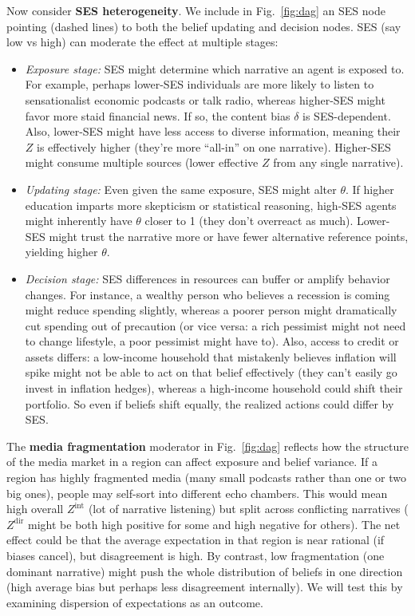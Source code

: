 \documentclass[12pt]{article}
\begin{document}
Now consider \textbf{SES heterogeneity}. We include in Fig.~\ref{fig:dag} an SES node pointing (dashed lines) to both the belief updating and decision nodes. SES (say low vs high) can moderate the effect at multiple stages:
\begin{itemize}
    \item \emph{Exposure stage:} SES might determine which narrative an agent is exposed to. For example, perhaps lower-SES individuals are more likely to listen to sensationalist economic podcasts or talk radio, whereas higher-SES might favor more staid financial news. If so, the content bias $\delta$ is SES-dependent. Also, lower-SES might have less access to diverse information, meaning their $Z$ is effectively higher (they're more ``all-in'' on one narrative). Higher-SES might consume multiple sources (lower effective $Z$ from any single narrative).
    \item \emph{Updating stage:} Even given the same exposure, SES might alter $\theta$. If higher education imparts more skepticism or statistical reasoning, high-SES agents might inherently have $\theta$ closer to 1 (they don't overreact as much). Lower-SES might trust the narrative more or have fewer alternative reference points, yielding higher $\theta$.
    \item \emph{Decision stage:} SES differences in resources can buffer or amplify behavior changes. For instance, a wealthy person who believes a recession is coming might reduce spending slightly, whereas a poorer person might dramatically cut spending out of precaution (or vice versa: a rich pessimist might not need to change lifestyle, a poor pessimist might have to). Also, access to credit or assets differs: a low-income household that mistakenly believes inflation will spike might not be able to act on that belief effectively (they can't easily go invest in inflation hedges), whereas a high-income household could shift their portfolio. So even if beliefs shift equally, the realized actions could differ by SES.
\end{itemize}

The \textbf{media fragmentation} moderator in Fig.~\ref{fig:dag} reflects how the structure of the media market in a region can affect exposure and belief variance. If a region has highly fragmented media (many small podcasts rather than one or two big ones), people may self-sort into different echo chambers. This would mean high overall $Z^{\text{int}}$ (lot of narrative listening) but split across conflicting narratives ($Z^{\text{dir}}$ might be both high positive for some and high negative for others). The net effect could be that the average expectation in that region is near rational (if biases cancel), but disagreement is high. By contrast, low fragmentation (one dominant narrative) might push the whole distribution of beliefs in one direction (high average bias but perhaps less disagreement internally). We will test this by examining dispersion of expectations as an outcome.
\end{document}
